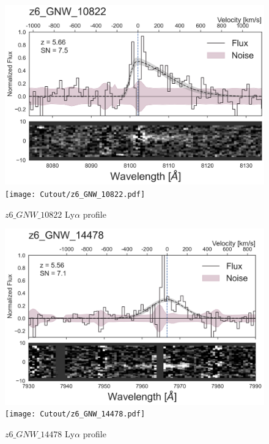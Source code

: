 \documentclass[12pt,english]{article}
\begin{document}
\begin{figure}
\begin{center}\includegraphics[width=12cm, trim=0.1cm 0cm 0cm -1cm]{LyaProfiles/z6_GNW_10822.png}
\texttt{[image: Cutout/z6\_GNW\_10822.pdf]}
\caption{$z6\_GNW\_10822$ Ly$\alpha$ profile}
\end{center}
\end{figure}
\clearpage
\begin{figure}
\begin{center}\includegraphics[width=12cm, trim=0.1cm 0cm 0cm -1cm]{LyaProfiles/z6_GNW_14478.png}
\texttt{[image: Cutout/z6\_GNW\_14478.pdf]}
\caption{$z6\_GNW\_14478$ Ly$\alpha$ profile}
\end{center}
\end{figure}
\clearpage
\end{document}
